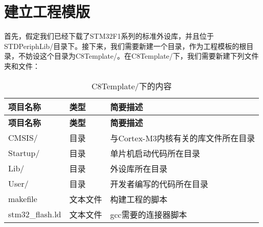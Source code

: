 \section{建立工程模版}
首先，假定我们已经下载了STM32F1系列的标准外设库，并且位于STDPeriphLib/目录下。接下来，我们需要新建一个目录，作为工程模板的根目录，不妨设这个目录为C8Template/。在C8Template/下，我们需要新建下列文件夹和文件：
\begin{center}
	\begin{longtable}[l]{| p{30mm} | p{30mm} | p{80mm} |}
		\caption{C8Template/下的内容}\\
		\hline 
		\rowcolor{Gray}
		\textbf{项目名称} & \textbf{类型} & \textbf{简要描述} \\
		\hline
		\endfirsthead
		
		\hline 
		\rowcolor{Gray}
		\textbf{项目名称} & \textbf{类型} & \textbf{简要描述} \\
		\hline
		\endhead
		
		CMSIS/ &  目录 & 与Cortex-M3内核有关的库文件所在目录 \\ 
		Startup/ & 目录 & 单片机启动代码所在目录 \\
		Lib/ & 目录 & 外设库所在目录 \\
		User/ & 目录 & 开发者编写的代码所在目录 \\
		makefile & 文本文件 & 构建工程的脚本 \\
		stm32\_flash.ld & 文本文件 & gcc需要的连接器脚本 \\
		\hline
	\end{longtable}
\end{center}
\par 



























